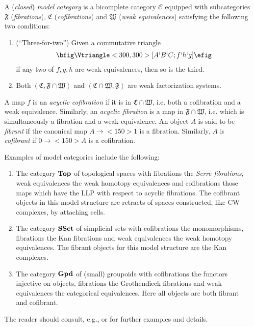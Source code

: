 \documentclass[12pt]{amsart}
\newcommand{\groupoids}{\textnormal{\textbf{Gpd}}}
\newcommand{\topcat}{\textnormal{\textbf{Top}}}
\newcommand{\ssets}{\textnormal{\textbf{SSet}}}
\theoremstyle{definition}
\theoremstyle{remark}
\begin{document}
A (\emph{closed}) \emph{model category} \cite{Quillen:HA} is a bicomplete category $\mathcal{C}$
equipped with subcategories $\mathfrak{F}$ (\emph{fibrations}), $\mathfrak{C}$
(\emph{cofibrations}) and $\mathfrak{W}$ (\emph{weak equivalences})
satisfying the following two conditions:
\begin{enumerate}
\item (``Three-for-two'') Given a commutative triangle
  \begin{align*}
    \bfig
    \Vtriangle<300,300>[A`B`C;f`h`g]
    \efig
  \end{align*}
  if any two of $f,g,h$ are weak equivalences, then so is the third.
\item Both $(\mathfrak{C},\mathfrak{F}\cap\mathfrak{W})$ and
$(\mathfrak{C}\cap\mathfrak{W},\mathfrak{F})$ are weak factorization systems.
\end{enumerate}
A map $f$ is an \emph{acyclic cofibration} if it is in
$\mathfrak{C}\cap\mathfrak{W}$, i.e. both a
cofibration and a weak equivalence.  Similarly, an \emph{acyclic
  fibration} is a map in $\mathfrak{F}\cap\mathfrak{W}$, i.e. which is
simultaneously a fibration and a weak
equivalence.  An object $A$ is said to be \emph{fibrant} if the
canonical map $A\to<150>1$ is a fibration.  Similarly, $A$ is
\emph{cofibrant} if $0\to<150>A$ is a cofibration.

Examples of model categories include the following:
\begin{enumerate}
\item The category $\topcat$ of topological spaces with fibrations the
  \emph{Serre fibrations}, weak equivalences the weak homotopy
  equivalences and cofibrations those maps which have the LLP with
  respect to acyclic fibrations.  The cofibrant objects in this model
  structure are retracts of spaces constructed, like CW-complexes, by
  attaching cells.
\item The category $\ssets$ of simplicial sets with cofibrations the
  monomorphisms, fibrations the Kan fibrations and weak equivalences
  the weak homotopy equivalences.  The fibrant objects for this model
  structure are the Kan complexes.
\item The category $\groupoids$ of (small) groupoids with cofibrations
  the functors injective on objects, fibrations the Grothendieck
  fibrations and weak equivalences the categorical equivalences.  Here
  all objects are both fibrant and cofibrant.
\end{enumerate}
The reader should consult, e.g., \cite{Hovey:MC} or \cite{Dwyer:HTMC}
for further examples and details.
\end{document}

